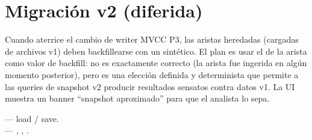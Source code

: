 \section{Migración v2 (diferida)}

Cuando aterrice el cambio de writer MVCC P3, las aristas
heredadas (cargadas de archivos v1) deben backfillearse con un
 sintético. El plan es usar el
 de la arista como valor de backfill: no es
exactamente correcto (la arista fue ingerida en algún momento
posterior), pero es una elección definida y determinista que
permite a las queries de snapshot v2 producir resultados
sensatos contra datos v1. La UI muestra un banner
``snapshot aproximado'' para que el analista lo sepa.

\begin{inthecode}
 ---
load / save.\\
 ---
, , .
\end{inthecode}
